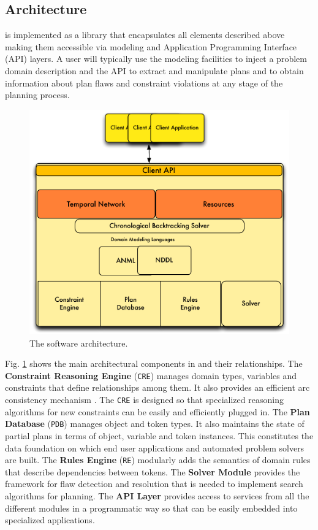 \subsection{Architecture}
\label{sec:europa:arch}

\eu is implemented as a library that encapsulates all elements
described above making them accessible via modeling and Application
Programming Interface (API) layers.  A user will typically use the
modeling facilities to inject a problem domain description and the
API to extract and manipulate plans and to obtain information about
plan flaws and constraint violations at any stage of the planning
process.

\begin{figure}
\centering
\includegraphics[scale=0.4]{figs/EUROPA-Architecture.pdf}
\caption{\small The \eu software architecture.}
\label{fig:europa-architecture}
\end{figure}

Fig. \ref{fig:europa-architecture} shows the main architectural
components in \eu and their relationships. The \textbf{Constraint
  Reasoning Engine} (\texttt{CRE}) manages domain types, variables and
constraints that define relationships among them. It also provides an
efficient arc consistency mechanism \cite{mackworth77}. The
\texttt{CRE} is designed so that specialized reasoning algorithms for
new constraints can be easily and efficiently plugged in. The
\textbf{Plan Database} (\texttt{PDB}) manages object and token
types. It also maintains the state of partial plans in terms of
object, variable and token instances. This constitutes the data
foundation on which end user applications and automated problem solvers
 are built. The \textbf{Rules Engine} (\texttt{RE})
modularly adds the semantics of domain rules that describe
dependencies between tokens. The \textbf{Solver Module} provides the
framework for flaw detection and resolution that is needed to
implement search algorithms for planning. The \textbf{API Layer}
provides access to services from all the different modules in a
programmatic way so that \eu can be easily embedded into specialized
applications.

